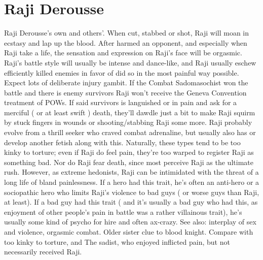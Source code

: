 \documentclass[12pt]{book}
\begin{document}
\chapter{Raji Derousse}

Raji Derousse's own and others'. When cut, stabbed or shot, Raji will moan in ecstasy and lap up the blood. After harmed an opponent, and especially when Raji take a life, the sensation and expression on Raji's face will be orgasmic. Raji's battle style will usually be intense and dance-like, and Raji usually eschew efficiently killed enemies in favor of did so in the most painful way possible. Expect lots of deliberate injury gambit. If the Combat Sadomasochist won the battle and there is enemy survivors Raji won't receive the Geneva Convention treatment of POWs. If said survivors is languished or in pain and ask for a merciful ( or at least swift ) death, they'll dawdle just a bit to make Raji squirm by stuck fingers in wounds or shooting/stabbing Raji some more. Raji probably evolve from a thrill seeker who craved combat adrenaline, but usually also has or develop another fetish along with this. Naturally, these types tend to be too kinky to torture; even if Raji do feel pain, they're too warped to register Raji as something bad. Nor do Raji fear death, since most perceive Raji as the ultimate rush. However, as extreme hedonists, Raji can be intimidated with the threat of a long life of bland painlessness. If a hero had this trait, he's often an anti-hero or a sociopathic hero who limits Raji's violence to bad guys ( or worse guys than Raji, at least). If a bad guy had this trait ( and it's usually a bad guy who had this, as enjoyment of other people's pain in battle was a rather villainous trait), he's usually some kind of psycho for hire and often ax-crazy. See also: interplay of sex and violence, orgasmic combat. Older sister clue to blood knight. Compare with too kinky to torture, and The sadist, who enjoyed inflicted pain, but not necessarily received Raji.
\end{document}
